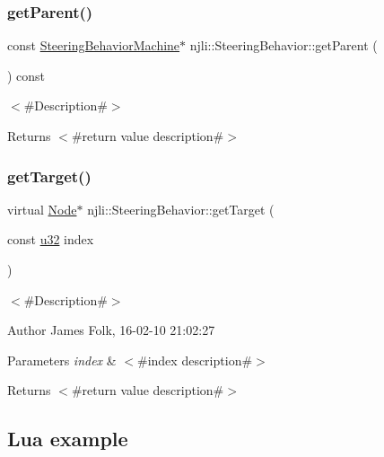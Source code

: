 \subsubsection{\texorpdfstring{get\+Parent()}{getParent()}\hspace{0.1cm}{\footnotesize\ttfamily [2/2]}}
{\footnotesize\ttfamily const \mbox{\hyperlink{classnjli_1_1_steering_behavior_machine}{Steering\+Behavior\+Machine}}$\ast$ njli\+::\+Steering\+Behavior\+::get\+Parent (\begin{DoxyParamCaption}{ }\end{DoxyParamCaption}) const\hspace{0.3cm}{\ttfamily [protected]}}

$<$\#\+Description\#$>$

\begin{DoxyReturn}{Returns}
$<$\#return value description\#$>$ 
\end{DoxyReturn}
\mbox{\label{classnjli_1_1_steering_behavior_a693361a80cba3b7beb75a2dcf0bd63dd}} 
\subsubsection{\texorpdfstring{get\+Target()}{getTarget()}\hspace{0.1cm}{\footnotesize\ttfamily [1/2]}}
{\footnotesize\ttfamily virtual \mbox{\hyperlink{classnjli_1_1_node}{Node}}$\ast$ njli\+::\+Steering\+Behavior\+::get\+Target (\begin{DoxyParamCaption}\item[{const \mbox{\hyperlink{_util_8h_a10e94b422ef0c20dcdec20d31a1f5049}{u32}}}]{index }\end{DoxyParamCaption})\hspace{0.3cm}{\ttfamily [virtual]}}



$<$\#\+Description\#$>$ 

\begin{DoxyAuthor}{Author}
James Folk, 16-\/02-\/10 21\+:02\+:27
\end{DoxyAuthor}

\begin{DoxyParams}{Parameters}
{\em index} & $<$\#index description\#$>$\\
\hline
\end{DoxyParams}
\begin{DoxyReturn}{Returns}
$<$\#return value description\#$>$
\end{DoxyReturn}
\hypertarget{classnjli_1_1_steering_behavior_wander_ex1}{}\subsection{Lua example}\label{classnjli_1_1_steering_behavior_wander_ex1}

